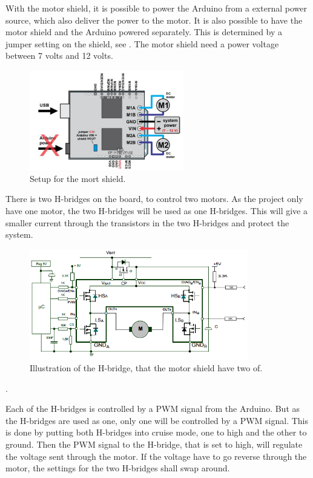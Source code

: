With the motor shield, it is possible to power the Arduino from a external power source, which also deliver the power to the motor. It is also possible to have the motor shield and the Arduino powered separately. This is determined by a jumper setting on the shield, see . The motor shield need a power voltage between 7 volts and 12 volts.

\begin{figure}[H]
	\centering
	\includegraphics[width=0.60\textwidth]{figures/MotordriverIO}
		\caption{Setup for the mort shield.}
	\label{MotorDriveIO}
\end{figure}

There is two H-bridges on the board, to control two motors. As the project only have one motor, the two H-bridges will be used as one H-bridges. This will give a smaller current through the transistors in the two H-bridges and protect the system.

\begin{figure}[H]
	\centering
	\includegraphics[width=0.85\textwidth]{figures/Hbridges}
		\caption{Illustration of the H-bridge, that the motor shield have two of.}
	\label{Hbridges}
\end{figure}.

Each of the H-bridges is controlled by a PWM signal from the Arduino. But as the H-bridges are used as one, only one will be controlled by a PWM signal. This is done by putting both H-bridges into cruise mode, one to high and the other to ground. Then the PWM signal to the H-bridge, that is set to high, will regulate the voltage sent through the motor. If the voltage have to go reverse through the motor, the settings for the two H-bridges shall swap around.

